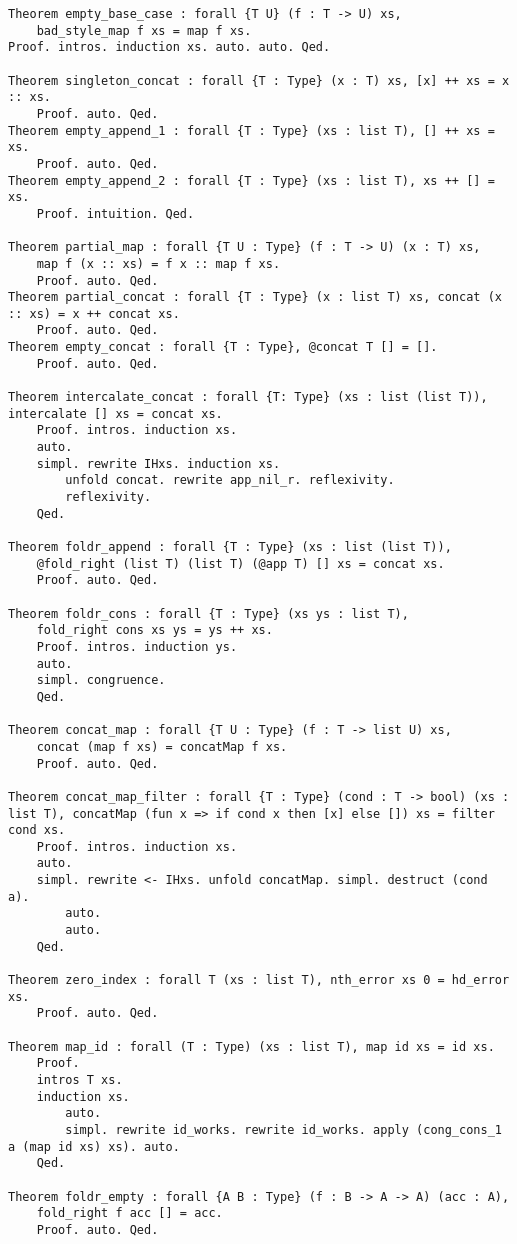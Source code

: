 \begin{verbatim}
Theorem empty_base_case : forall {T U} (f : T -> U) xs,
    bad_style_map f xs = map f xs.
Proof. intros. induction xs. auto. auto. Qed.

Theorem singleton_concat : forall {T : Type} (x : T) xs, [x] ++ xs = x :: xs.
    Proof. auto. Qed.
Theorem empty_append_1 : forall {T : Type} (xs : list T), [] ++ xs = xs.
    Proof. auto. Qed.
Theorem empty_append_2 : forall {T : Type} (xs : list T), xs ++ [] = xs.
    Proof. intuition. Qed.

Theorem partial_map : forall {T U : Type} (f : T -> U) (x : T) xs,
    map f (x :: xs) = f x :: map f xs.
    Proof. auto. Qed.
Theorem partial_concat : forall {T : Type} (x : list T) xs, concat (x :: xs) = x ++ concat xs.
    Proof. auto. Qed.
Theorem empty_concat : forall {T : Type}, @concat T [] = [].
    Proof. auto. Qed.

Theorem intercalate_concat : forall {T: Type} (xs : list (list T)), intercalate [] xs = concat xs.
    Proof. intros. induction xs.
    auto.
    simpl. rewrite IHxs. induction xs.
        unfold concat. rewrite app_nil_r. reflexivity.
        reflexivity.
    Qed.

Theorem foldr_append : forall {T : Type} (xs : list (list T)),
    @fold_right (list T) (list T) (@app T) [] xs = concat xs.
    Proof. auto. Qed.

Theorem foldr_cons : forall {T : Type} (xs ys : list T),
    fold_right cons xs ys = ys ++ xs.
    Proof. intros. induction ys.
    auto.
    simpl. congruence.
    Qed.

Theorem concat_map : forall {T U : Type} (f : T -> list U) xs,
    concat (map f xs) = concatMap f xs.
    Proof. auto. Qed.

Theorem concat_map_filter : forall {T : Type} (cond : T -> bool) (xs : list T), concatMap (fun x => if cond x then [x] else []) xs = filter cond xs.
    Proof. intros. induction xs.
    auto.
    simpl. rewrite <- IHxs. unfold concatMap. simpl. destruct (cond a).
        auto.
        auto.
    Qed.

Theorem zero_index : forall T (xs : list T), nth_error xs 0 = hd_error xs.
    Proof. auto. Qed.

Theorem map_id : forall (T : Type) (xs : list T), map id xs = id xs.
    Proof.
    intros T xs.
    induction xs.
        auto.
        simpl. rewrite id_works. rewrite id_works. apply (cong_cons_1 a (map id xs) xs). auto.
    Qed.

Theorem foldr_empty : forall {A B : Type} (f : B -> A -> A) (acc : A),
    fold_right f acc [] = acc.
    Proof. auto. Qed.


\end{verbatim}

